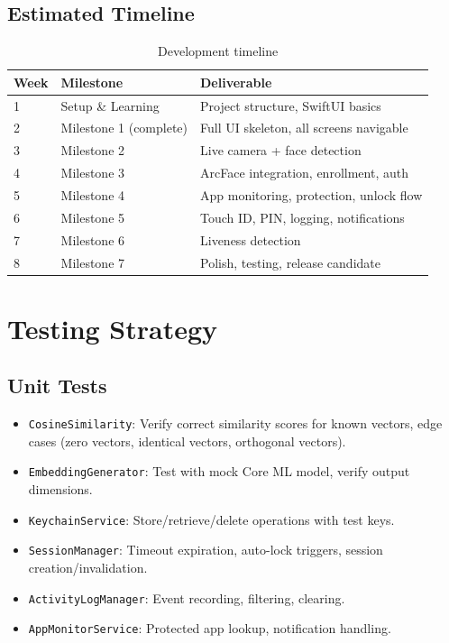 \documentclass[12pt,a4paper]{report}
\begin{document}
\section{Estimated Timeline}
\begin{table}[H]
\centering
\begin{tabular}{lll}
\toprule
\textbf{Week} & \textbf{Milestone} & \textbf{Deliverable} \\
\midrule
1 & Setup \& Learning & Project structure, SwiftUI basics \\
2 & Milestone 1 (complete) & Full UI skeleton, all screens navigable \\
3 & Milestone 2 & Live camera + face detection \\
4 & Milestone 3 & ArcFace integration, enrollment, auth \\
5 & Milestone 4 & App monitoring, protection, unlock flow \\
6 & Milestone 5 & Touch ID, PIN, logging, notifications \\
7 & Milestone 6 & Liveness detection \\
8 & Milestone 7 & Polish, testing, release candidate \\
\bottomrule
\end{tabular}
\caption{Development timeline}
\end{table}

\chapter{Testing Strategy}

\section{Unit Tests}
\begin{itemize}[noitemsep]
    \item \texttt{CosineSimilarity}: Verify correct similarity scores for known vectors, edge cases (zero vectors, identical vectors, orthogonal vectors).
    \item \texttt{EmbeddingGenerator}: Test with mock Core ML model, verify output dimensions.
    \item \texttt{KeychainService}: Store/retrieve/delete operations with test keys.
    \item \texttt{SessionManager}: Timeout expiration, auto-lock triggers, session creation/invalidation.
    \item \texttt{ActivityLogManager}: Event recording, filtering, clearing.
    \item \texttt{AppMonitorService}: Protected app lookup, notification handling.
\end{itemize}
\end{document}

